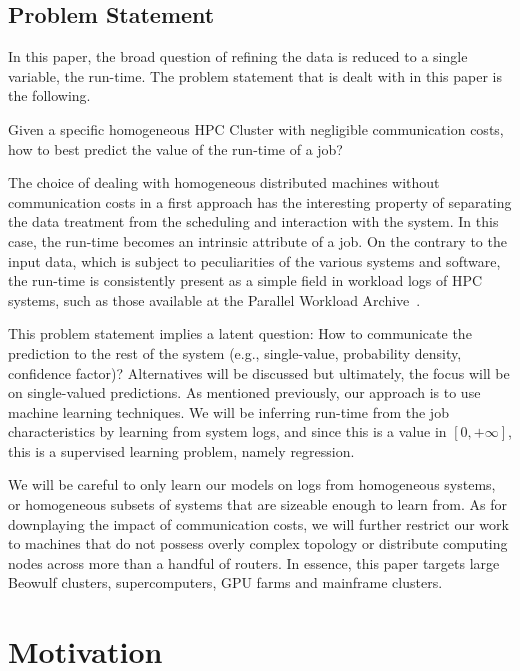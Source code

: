 \documentclass{article}
\begin{document}
\subsection{Problem Statement}
In this paper, the broad question of refining the data is reduced to a single variable, the run-time. The problem statement that is dealt with in this paper is the following.

Given a specific homogeneous HPC Cluster with negligible communication costs, how to best predict the value of the run-time of a job?

The choice of dealing with homogeneous distributed machines without communication costs in a first approach has the interesting property of separating the data treatment from the scheduling and interaction with the system.
In this case, the run-time becomes an intrinsic attribute of a job.
On the contrary to the input data, which is subject to peculiarities of the various systems and software, the run-time is consistently present as a simple field in workload logs of HPC systems, such as those available at the Parallel Workload Archive~\cite{workloadarchive}.

This problem statement implies a latent question: How to communicate the prediction to the rest of the system (e.g., single-value, probability density, confidence factor)? Alternatives will be discussed but ultimately, the focus will be on single-valued predictions.
As mentioned previously, our approach is to use machine learning techniques. We will be inferring run-time from the job characteristics by learning from system logs, and since this is a value in $[0,+\infty ]$, this is a supervised learning problem, namely regression.

We will be careful to only learn our models on logs from homogeneous systems, or homogeneous subsets of systems that are sizeable enough to learn from.
As for downplaying the impact of communication costs, we will further restrict our work to machines that do not possess overly complex topology or distribute computing nodes across more than a handful of routers.
In essence, this paper targets large Beowulf clusters, supercomputers, GPU farms and mainframe clusters.

\section{Motivation}
\end{document}

